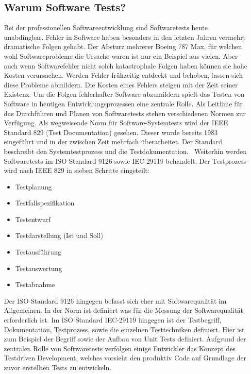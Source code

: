 \subsection{Warum Software Tests?}
Bei der professionellen Softwareentwicklung sind Softwaretests heute unabdingbar. Fehler in Software haben besonders in den letzten Jahren vermehrt dramatische Folgen gehabt. Der Absturz mehrerer Boeing 787 Max, für welchen wohl Softwareprobleme die Ursache waren \cite{tagesschau.2021} ist nur ein Beispiel aus vielen. Aber auch wenn Softwarefehler nicht solch katastrophale Folgen haben können sie hohe Kosten verursachen. 
Werden Fehler frühzeitig entdeckt und behoben, lassen sich diese Probleme abmildern. Die Kosten eines Fehlers steigen mit der Zeit seiner Existenz.\cite{DanielLindner.2020}
Um die Folgen fehlerhafter Software abzumildern spielt das Testen von Software in heutigen Entwicklungsprozessen eine zentrale Rolle. Als Leitlinie für das Durchführen und Planen von Softwaretests stehen verschiedenen Normen zur Verfügung. Als wegweisende Norm f{\"u}r Software-Systemtests wird der IEEE Standard 829 (Test Documentation) gesehen. Dieser wurde bereits 1983 eingef{\"u}hrt und in der zwischen Zeit mehrfach {\"u}berarbeitet. Der Standard beschreibt den Systemtestprozess und die Testdokumentation.~\cite[S.~21]{Witte.2016} Weiterhin werden Softwaretests im ISO-Standard 9126 sowie IEC-29119 behandelt. Der Testprozess wird nach IEEE 829 in sieben Schritte eingeteilt:
\begin{itemize}
	\item Testplanung
	\item Testfallspezifikation
	\item Testentwurf
	\item Testdarstellung (Ist und Soll)
	\item Testausführung
	\item Testauswertung
	\item Testabnahme
\end{itemize}
Der ISO-Standard 9126 hingegen befasst sich eher mit Softwarequalität im Allgemeinen. In der Norm ist definiert was für die Messung der Softwarequalität erforderlich ist. Im ISO Standard IEC-29119 hingegen ist der Testbegriff, Dokumentation, Testprozess, sowie die einzelnen Testtechniken definiert. Hier ist zum Beispiel der Begriff sowie der Aufbau von Unit Tests definiert.\cite{Witte.2016}
Aufgrund der zentralen Rolle von Softwaretests verfolgen einige Entwickler das Konzept des Testdriven Development, welches vorsieht den produktiv Code auf Grundlage der zuvor erstellten Tests zu entwickeln.
